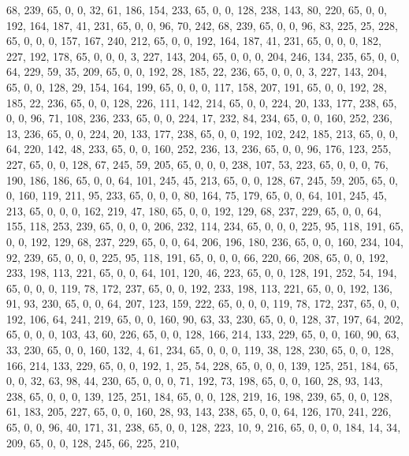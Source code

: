 \begin{DoxyCode}
       68, 239, 65, 0, 0, 32, 61, 186, 154, 233, 65, 0, 0, 128, 238, 143, 80, 220, 65, 0, 0, 192, 164, 187, 41, 231,
       65, 0, 0, 96, 70, 242, 68, 239, 65, 0, 0, 96, 83, 225, 25, 228, 65, 0, 0, 0, 157, 167, 240, 212, 65, 0, 0,
       192, 164, 187, 41, 231, 65, 0, 0, 0, 182, 227, 192, 178, 65, 0, 0, 0, 3, 227, 143, 204, 65, 0, 0, 0, 204,
       246, 134, 235, 65, 0, 0, 64, 229, 59, 35, 209, 65, 0, 0, 192, 28, 185, 22, 236, 65, 0, 0, 0, 3, 227, 143, 204,
       65, 0, 0, 128, 29, 154, 164, 199, 65, 0, 0, 0, 117, 158, 207, 191, 65, 0, 0, 192, 28, 185, 22, 236, 65, 0,
       0, 128, 226, 111, 142, 214, 65, 0, 0, 224, 20, 133, 177, 238, 65, 0, 0, 96, 71, 108, 236, 233, 65, 0, 0, 224,
       17, 232, 84, 234, 65, 0, 0, 160, 252, 236, 13, 236, 65, 0, 0, 224, 20, 133, 177, 238, 65, 0, 0, 192, 102,
       242, 185, 213, 65, 0, 0, 64, 220, 142, 48, 233, 65, 0, 0, 160, 252, 236, 13, 236, 65, 0, 0, 96, 176, 123,
       255, 227, 65, 0, 0, 128, 67, 245, 59, 205, 65, 0, 0, 0, 238, 107, 53, 223, 65, 0, 0, 0, 76, 190, 186, 186, 65,
       0, 0, 64, 101, 245, 45, 213, 65, 0, 0, 128, 67, 245, 59, 205, 65, 0, 0, 160, 119, 211, 95, 233, 65, 0, 0, 0,
       80, 164, 75, 179, 65, 0, 0, 64, 101, 245, 45, 213, 65, 0, 0, 0, 162, 219, 47, 180, 65, 0, 0, 192, 129, 68,
       237, 229, 65, 0, 0, 64, 155, 118, 253, 239, 65, 0, 0, 0, 206, 232, 114, 234, 65, 0, 0, 0, 225, 95, 118, 191,
       65, 0, 0, 192, 129, 68, 237, 229, 65, 0, 0, 64, 206, 196, 180, 236, 65, 0, 0, 160, 234, 104, 92, 239, 65,
       0, 0, 0, 225, 95, 118, 191, 65, 0, 0, 0, 66, 220, 66, 208, 65, 0, 0, 192, 233, 198, 113, 221, 65, 0, 0, 64,
       101, 120, 46, 223, 65, 0, 0, 128, 191, 252, 54, 194, 65, 0, 0, 0, 119, 78, 172, 237, 65, 0, 0, 192, 233, 198,
       113, 221, 65, 0, 0, 192, 136, 91, 93, 230, 65, 0, 0, 64, 207, 123, 159, 222, 65, 0, 0, 0, 119, 78, 172,
       237, 65, 0, 0, 192, 106, 64, 241, 219, 65, 0, 0, 160, 90, 63, 33, 230, 65, 0, 0, 128, 37, 197, 64, 202, 65, 0,
       0, 0, 103, 43, 60, 226, 65, 0, 0, 128, 166, 214, 133, 229, 65, 0, 0, 160, 90, 63, 33, 230, 65, 0, 0, 160,
       132, 4, 61, 234, 65, 0, 0, 0, 119, 38, 128, 230, 65, 0, 0, 128, 166, 214, 133, 229, 65, 0, 0, 192, 1, 25, 54,
       228, 65, 0, 0, 0, 139, 125, 251, 184, 65, 0, 0, 32, 63, 98, 44, 230, 65, 0, 0, 0, 71, 192, 73, 198, 65, 0,
       0, 160, 28, 93, 143, 238, 65, 0, 0, 0, 139, 125, 251, 184, 65, 0, 0, 128, 219, 16, 198, 239, 65, 0, 0, 128,
       61, 183, 205, 227, 65, 0, 0, 160, 28, 93, 143, 238, 65, 0, 0, 64, 126, 170, 241, 226, 65, 0, 0, 96, 40, 171,
       31, 238, 65, 0, 0, 128, 223, 10, 9, 216, 65, 0, 0, 0, 184, 14, 34, 209, 65, 0, 0, 128, 245, 66, 225, 210,

\end{DoxyCode}
